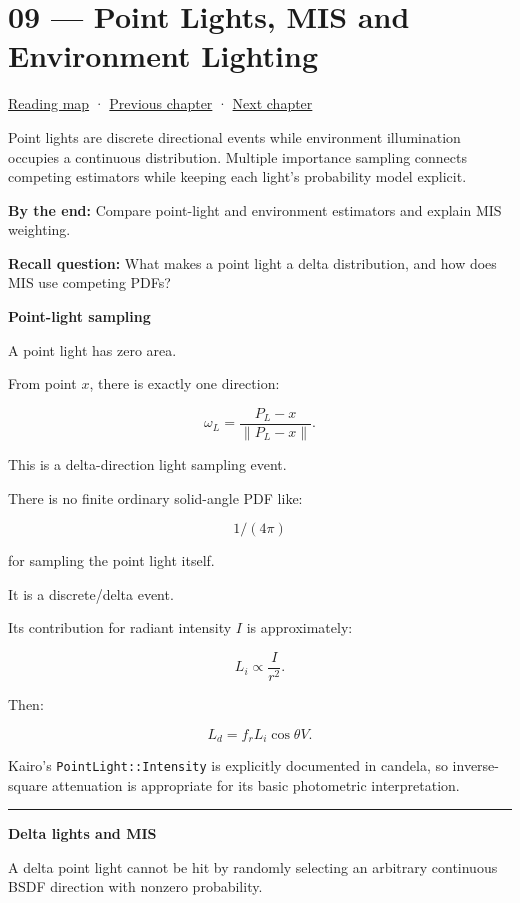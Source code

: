 \hypertarget{03-visual-computing-i-ch009}{}
\chapter{09 --- Point Lights, MIS and Environment Lighting}\label{03-visual-computing-i-ch009-point-lights-mis-and-environment-lighting}

\hyperref[volume-reading-map]{Reading map} · \hyperref[03-visual-computing-i-ch008]{Previous chapter} · \hyperref[03-visual-computing-i-ch010]{Next chapter}

Point lights are discrete directional events while environment illumination occupies a continuous distribution. Multiple importance sampling connects competing estimators while keeping each light's probability model explicit.

\textbf{By the end:} Compare point-light and environment estimators and explain MIS weighting.

\textbf{Recall question:} What makes a point light a delta distribution, and how does MIS use competing PDFs?

\textbf{Point-light sampling}

A point light has zero area.

From point \(x\), there is exactly one direction:

\[
\omega_L
=
\frac{
P_L-x
}{
\|P_L-x\|
}.
\]

This is a delta-direction light sampling event.

There is no finite ordinary solid-angle PDF like:

\[
1/(4\pi)
\]

for sampling the point light itself.

It is a discrete/delta event.

Its contribution for radiant intensity \(I\) is approximately:

\[
L_i
\propto
\frac{
I
}{
r^2
}.
\]

Then:

\[
L_d
=
f_r
L_i
\cos\theta
V.
\]

Kairo's \texttt{PointLight::Intensity} is explicitly documented in candela, so inverse-square attenuation is appropriate for its basic photometric interpretation.

\begin{center}\rule{0.5\linewidth}{0.5pt}\end{center}

\textbf{Delta lights and MIS}

A delta point light cannot be hit by randomly selecting an arbitrary continuous BSDF direction with nonzero probability.

